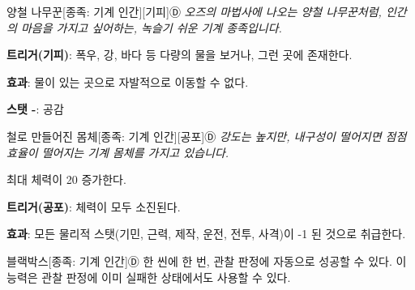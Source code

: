 \documentclass{report}
\begin{document}
	\begin{story}{양철 나무꾼}{[종족: 기계 인간][기피]Ⓓ}
		\textit{오즈의 마법사에 나오는 양철 나무꾼처럼, 인간의 마음을 가지고 싶어하는, 녹슬기 쉬운 기계 종족입니다.}
		
		\textbf{트리거(기피)}: 폭우, 강, 바다 등 다량의 물을 보거나, 그런 곳에 존재한다.
		
		\textbf{효과}: 물이 있는 곳으로 자발적으로 이동할 수 없다.
		
		\smallskip
		
		\textbf{스탯 -}: 공감
		
	\end{story}
	
	\begin{story}{철로 만들어진 몸체}{[종족: 기계 인간][공포]Ⓓ}
		\textit{강도는 높지만, 내구성이 떨어지면 점점 효율이 떨어지는 기계 몸체를 가지고 있습니다.}
		
		\smallskip
		
		최대 체력이 20 증가한다.
		
		\smallskip
		
		\textbf{트리거(공포)}: 체력이 모두 소진된다.
		
		\textbf{효과}: 모든 물리적 스탯(기민, 근력, 제작, 운전, 전투, 사격)이 -1 된 것으로 취급한다.
		
	\end{story}
	
	\begin{story}{블랙박스}{[종족: 기계 인간]Ⓓ}
		한 씬에 한 번, 관찰 판정에 자동으로 성공할 수 있다. 이 능력은 관찰 판정에 이미 실패한 상태에서도 사용할 수 있다.
		
	\end{story}
\end{document}
